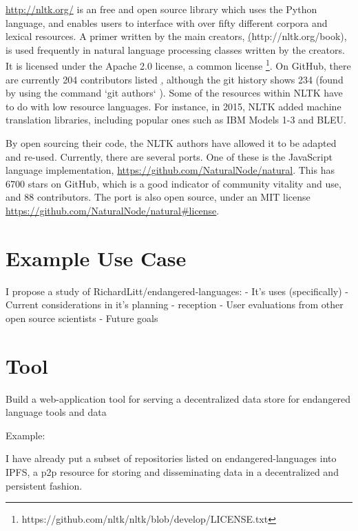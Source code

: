 \documentclass[10pt, a4paper]{article}
\begin{document}
\href{NLTK (Natural Language Toolkit)}{http://nltk.org/} is an free and open source library which uses the Python language, and enables users to interface with over fifty different corpora and lexical resources. A primer written by the main creators, \href{Natural Language Processing with Python}(http://nltk.org/book), is used frequently in natural language processing classes written by the creators. It is licensed under the Apache 2.0 license, a common license \footnote{https://github.com/nltk/nltk/blob/develop/LICENSE.txt}. On GitHub, there are currently 204 contributors listed \href{https://github.com/nltk/nltk/graphs/contributors}, although the git history shows 234 (found by using the command `git authors` %
). Some of the resources within NLTK have to do with low resource languages. For instance, in 2015, NLTK added machine translation libraries, including popular ones such as IBM Models 1-3 and BLEU.

By open sourcing their code, the NLTK authors have allowed it to be adapted and re-used. Currently, there are several ports.
One of these is the JavaScript language implementation, \href{https://github.com/NaturalNode/natural}{https://github.com/NaturalNode/natural}. This has 6700 stars on GitHub, which is a good indicator of community vitality and use, and 88 contributors. The port is also open source, under an MIT license \href{https://github.com/NaturalNode/natural\#license}{https://github.com/NaturalNode/natural\#license}.

\section{Example Use Case}

I propose a study of RichardLitt/endangered-languages:
- It's uses (specifically)
- Current considerations in it's planning
- reception
  - User evaluations from other open source scientists
- Future goals

\section{Tool}

Build a web-application tool for serving a decentralized data store for endangered language tools and data

Example:

I have already put a subset of repositories listed on endangered-languages into IPFS, a p2p resource for storing and disseminating data in a decentralized and persistent fashion.
\end{document}
